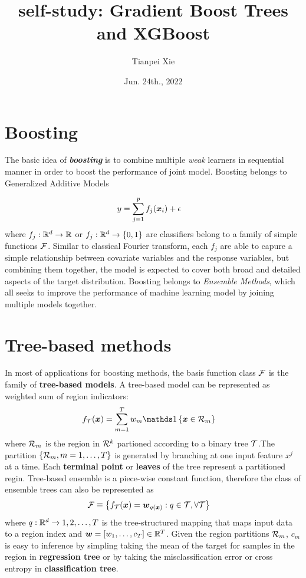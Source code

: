 \documentclass[11pt]{article}
\begin{document}
\title{self-study: Gradient Boost Trees and XGBoost}
\author{ Tianpei Xie}
\date{ Jun. 24th., 2022 }
\maketitle
\allowdisplaybreaks
\section{Boosting}
The basic idea of \emph{\textbf{boosting}} is to combine multiple \textit{weak} learners in sequential manner in order to boost the performance of joint model. Boosting belongs to Generalized Additive Models

\begin{align*}
y &= \sum_{j=1}^{p}f_j(\boldsymbol{x}_{i}) + \epsilon
\end{align*} where $f_{j}: {\mathbb R}^{d} \rightarrow {\mathbb R}$ or $f_{j}: {\mathbb R}^{d} \rightarrow \left\{0, 1\right\}$ are classifiers belong to a family of simple functions ${\mathcal F}$. Similar to classical Fourier transform, each $f_{j}$ are able to capure a simple relationship between covariate variables and the response variables, but combining them together, the model is expected to cover both broad and detailed aspects of the target distribution. Boosting belongs to \textit{Ensemble Methods}, which all seeks to improve the performance of machine learning model by joining multiple models together. 

\section{Tree-based methods}
In most of applications for boosting methods, the basis function class ${\mathcal F}$ is the family of \textbf{tree-based models}.  A tree-based model can be represented as weighted sum of region indicators: 
\begin{align*}
f_{\cT}(\mb{x}) &= \sum_{m=1}^{T}w_{m}\ind{\mb{x} \in \cR_{m}}
\end{align*} where ${\mathcal R}_{m}$ is the region in ${\mathcal R}^{k}$ partioned according to a binary tree ${\mathcal T}$.The partition $\left\{{\mathcal R}_{m}, m=1,\dots,T\right\}$ is generated by branching at one input feature $x^{j}$ at a time. Each \textbf{terminal point} or \textbf{leaves} of the tree represent a partitioned regin.  Tree-based ensemble is a piece-wise constant function,  therefore the class of ensemble trees can also be represented as
\begin{align*}
{\mathcal F} &\equiv \left\{ f_{ {\mathcal T}}(\boldsymbol{x}) = \boldsymbol{w}_{q(\boldsymbol{x})}: q \in {\mathcal T}, \forall  {\mathcal T}  \right\}
\end{align*} where $q: {\mathbb R}^{d} \rightarrow {1,2,\dots,T}$ is the tree-structured mapping that maps input data to a region index and $\boldsymbol{w} = \left[w_{1}, \dots, c_{T}\right] \in {\mathbb R}^{T}$. Given the region partitions ${\mathcal R}_{m}$,  $c_{m}$ is easy to inference by simpling taking the mean of the target for samples in the region in \textbf{regression tree} or by taking the misclassification error or cross entropy in \textbf{classification tree}.
\end{document}
